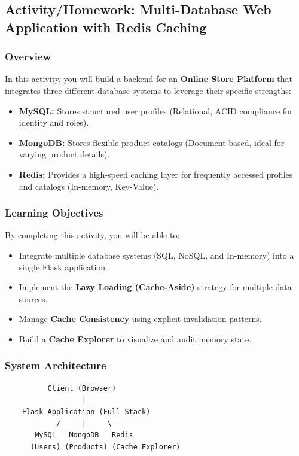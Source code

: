 \newpage
\subsection{Activity/Homework: Multi-Database Web Application with Redis Caching}

\subsubsection{Overview}
In this activity, you will build a backend for an \textbf{Online Store Platform} that integrates three different database systems to leverage their specific strengths:
\begin{itemize}
    \item \textbf{MySQL:} Stores structured user profiles (Relational, ACID compliance for identity and roles).
    \item \textbf{MongoDB:} Stores flexible product catalogs (Document-based, ideal for varying product details).
    \item \textbf{Redis:} Provides a high-speed caching layer for frequently accessed profiles and catalogs (In-memory, Key-Value).
\end{itemize}

\subsubsection{Learning Objectives}
By completing this activity, you will be able to:
\begin{itemize}
    \item Integrate multiple database systems (SQL, NoSQL, and In-memory) into a single Flask application.
    \item Implement the \textbf{Lazy Loading (Cache-Aside)} strategy for multiple data sources.
    \item Manage \textbf{Cache Consistency} using explicit invalidation patterns.
    \item Build a \textbf{Cache Explorer} to visualize and audit memory state.
\end{itemize}

\newpage
\subsubsection{System Architecture}
\begin{center}
\begin{verbatim}
          Client (Browser)
                  |
    Flask Application (Full Stack)
            /     |     \
       MySQL   MongoDB   Redis
      (Users) (Products) (Cache Explorer)
\end{verbatim}
\end{center}

